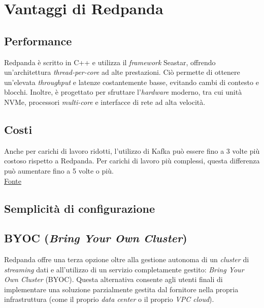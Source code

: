 \section{Vantaggi di Redpanda}
\subsection{Performance}
Redpanda è scritto in C++ e utilizza il \textit{framework} Seastar, offrendo un'architettura \textit{thread-per-core} ad alte prestazioni.
Ciò permette di ottenere un'elevata \textit{throughput} e latenze costantemente basse, evitando cambi di contesto e blocchi.
Inoltre, è progettato per sfruttare l'\textit{hardware} moderno, tra cui unità NVMe, processori \textit{multi-core} e interfacce di rete ad alta velocità.

\subsection{Costi}
Anche per carichi di lavoro ridotti, l'utilizzo di Kafka può essere fino a 3 volte più costoso rispetto a Redpanda. Per carichi di lavoro più complessi, questa differenza può aumentare fino a 5 volte o più.\\
\href{https://redpanda.com/blog/is-redpanda-better-than-kafka-tco-comparison}{Fonte}



\subsection{Semplicità di configurazione}

\subsection{BYOC (\textit{Bring Your Own Cluster})}
Redpanda offre una terza opzione oltre alla gestione autonoma di un \textit{cluster} di \textit{streaming}
dati e all'utilizzo di un servizio  completamente gestito: \textit{Bring Your Own Cluster} (BYOC).
Questa alternativa consente agli utenti finali di implementare una soluzione parzialmente gestita dal fornitore nella propria infrastruttura (come il proprio \textit{data center}
o il proprio \textit{VPC cloud}).\\


